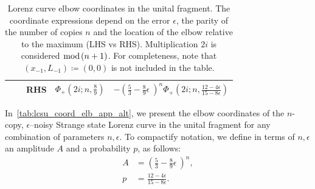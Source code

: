 \documentclass[pra,
aps,
twocolumn,
superscriptaddress,
groupedaddress,
nofootinbib,
reprint
]{revtex4-1}
\begin{document}
\begin{table}[h]
\begin{tabular}{c|c|c|r|r}
    & & RHS & $\Phi_+\left(2i;n,\frac{8}{9}\right)$ & $- \left( \frac{5}{3} - \frac{8}{9}\epsilon\ \right)^n\Phi_+\left(2i;n,\frac{12-4\epsilon}{15-8\epsilon}\right)$ \\ \hline
  \end{tabular}
  \caption{Lorenz curve elbow coordinates in the unital fragment.
  The coordinate expressions depend on the error $\epsilon$, the parity of the number of copies $n$ and the location of the elbow relative to the maximum (LHS vs RHS).
  Multiplication $2i$ is considered $\hspace{-6pt}\mod{\hspace{-2pt}(n+1)}$.
  For completeness, note that $(x_{-1}, L_{-1}) \coloneqq (0,0)$ is not included in the table.
  }
  \label{tab:lcsu_coord_elb_app}
\end{table}

In~\cref{tab:lcsu_coord_elb_app_alt}, we present the elbow coordinates of the $n$-copy, $\epsilon$--noisy Strange state Lorenz curve in the unital fragment for any combination of parameters $n, \epsilon$.
To compactify notation, we define in terms of $n, \epsilon$ an amplitude $A$ and a probability $p$, as follows:
\begin{align}
	A &= \left( \frac{5}{3} - \frac{8}{9}\epsilon\ \right)^n, \\
	p &= \frac{12-4\epsilon}{15-8\epsilon}.
\end{align}
\end{document}
